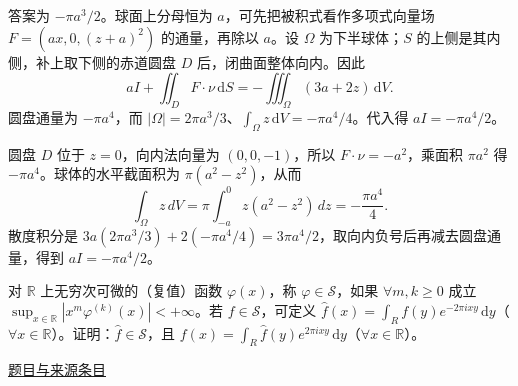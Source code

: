 \documentclass[UTF8,12pt,a4paper,fontset=fandol]{ctexart}
\begin{document}
\begin{solve}\label{ans:fin08-hi:3}

答案为 $-\pi a^3/2$。球面上分母恒为 $a$，可先把被积式看作多项式向量场 $F=(ax,0,(z+a)^2)$ 的通量，再除以 $a$。设 $\Omega$ 为下半球体；$S$ 的上侧是其内侧，补上取下侧的赤道圆盘 $D$ 后，闭曲面整体向内。因此
\[
aI+\iint_DF\cdot\nu\,\mathrm dS=-\iiint_\Omega(3a+2z)\,\mathrm dV.
\]
圆盘通量为 $-\pi a^4$，而 $|\Omega|=2\pi a^3/3$、$\int_\Omega z\,\mathrm dV=-\pi a^4/4$。代入得 $aI=-\pi a^4/2$。

圆盘 $D$ 位于 $z=0$，向内法向量为 $(0,0,-1)$，所以 $F\cdot\nu=-a^2$，乘面积 $\pi a^2$ 得 $-\pi a^4$。球体的水平截面积为 $\pi(a^2-z^2)$，从而
\[
\int_\Omega z\,dV=\pi\int_{-a}^0z(a^2-z^2)\,dz=-\frac{\pi a^4}{4}.
\]
散度积分是 $3a(2\pi a^3/3)+2(-\pi a^4/4)=3\pi a^4/2$，取向内负号后再减去圆盘通量，得到 $aI=-\pi a^4/2$。

\end{solve}

\begin{example}[来源序号7]\label{ex:fin08-hi:7}\label{pr:fin08-hi:7}

对 $\mathbb{R}$ 上无穷次可微的（复值）函数 $\varphi(x)$，称 $\varphi\in\mathcal{S}$，如果 $\forall m,k\geq 0$ 成立 $\sup_{x\in\mathbb{R}}\left|x^{m}\varphi^{(k)}(x)\right|<+\infty$。若 $f\in\mathcal{S}$，可定义 $\hat{f}(x)=\int_{R}f(y)e^{-2\pi ixy}\,\mathrm{d}y$（$\forall x\in\mathbb{R}$）。证明：$\hat{f}\in\mathcal{S}$，且 $f(x)=\int_{R}\hat{f}(y)e^{2\pi ixy}\,\mathrm{d}y$（$\forall x\in\mathbb{R}$）。

\par\href{https://github.com/lzxcr/cmc-mathematics/blob/64916fa1fdbc3e444a652eca204d5669058ee321/src/problems/finals/08/07.md}{题目与来源条目}

\end{example}
\end{document}
